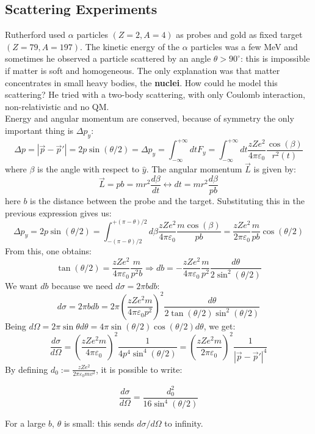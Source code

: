 \documentclass[10.75pt,a4paper,openright,bottom=2cm]{article}
\begin{document}
\subsection{Scattering Experiments}
Rutherford used $\alpha$ particles $(Z=2,A=4)$ as probes and gold as fixed target $(Z=79, A=197)$. The kinetic energy of the $\alpha$ particles was a few MeV and sometimes he observed a particle scattered by an angle $\theta>90^\circ$: this is impossible if matter is soft and homogeneous. The only explanation was that matter concentrates in small heavy bodies, the \textbf{nuclei}. How could he model this scattering? He tried with a two-body scattering, with only Coulomb interaction, non-relativistic and no QM.\\
Energy and angular momentum are conserved, because of symmetry the only important thing is $\Delta p_y$:
\[
\Delta p=|\Vec{p}-\Vec{p}'|=2p\sin(\theta/2)=\Delta p_y=\int_{-\infty}^{+\infty}dtF_y=\int_{-\infty}^{+\infty}dt\frac{zZe^2}{4\pi\varepsilon_0}\frac{\cos(\beta)}{r^2(t)}
\]
where $\beta$ is the angle with respect to $\hat{y}$. The angular momentum $\Vec{L}$ is given by:
\[
\Vec{L}=pb=mr^2\frac{d\beta}{dt}\leftrightarrow dt=mr^2\frac{d\beta}{pb}
\]
here $b$ is the distance between the probe and the target. Substituting this in the previous expression gives us:
\[
\Delta p_y=2p\sin(\theta/2)=\int_{-(\pi-\theta)/2}^{+(\pi-\theta)/2}d\beta\frac{zZe^2}{4\pi\varepsilon_0}\frac{m\cos(\beta)}{pb}=\frac{zZe^2}{2\pi\varepsilon_0}\frac{m}{pb}\cos(\theta/2)
\]
From this, one obtains:
\[
\tan(\theta/2)=\frac{zZe^2}{4\pi\varepsilon_0}\frac{m}{p^2b}\Rightarrow db=-\frac{zZe^2}{4\pi\varepsilon_0}\frac{m}{p^2}\frac{d\theta}{2\sin^2(\theta/2)}
\]
We want $db$ because we need $d\sigma=2\pi bdb$:
\[
d\sigma=2\pi bdb=2\pi\left(\frac{zZe^2m}{4\pi\varepsilon_0p^2}\right)^2\frac{d\theta}{2\tan(\theta/2)\sin^2(\theta/2)}
\]
Being $d\Omega=2\pi\sin\theta d\theta=4\pi\sin(\theta/2)\cos(\theta/2)d\theta$, we get:
\[
\frac{d\sigma}{d\Omega}=\left(\frac{zZe^2m}{4\pi\varepsilon_0}\right)^2\frac{1}{4p^4\sin^4(\theta/2)}=\left(\frac{zZe^2m}{2\pi\varepsilon_0}\right)^2\frac{1}{|\Vec{p}-\Vec{p}'|^4}
\]
By defining $d_0:=\frac{zZe^2}{2\pi\varepsilon_0mv^2}$, it is possible to write:
\begin{tcolorbox}[width=\textwidth,colback={yellow!50},title={Rutherford Scattering},colbacktitle={gray!50},coltitle=black]
\[
\frac{d\sigma}{d\Omega}=\frac{d_0^2}{16\sin^4(\theta/2)}
\]
\end{tcolorbox}
\noindent
For a large $b$, $\theta$ is small: this sends $d\sigma/d\Omega$ to infinity.\\
\end{document}
